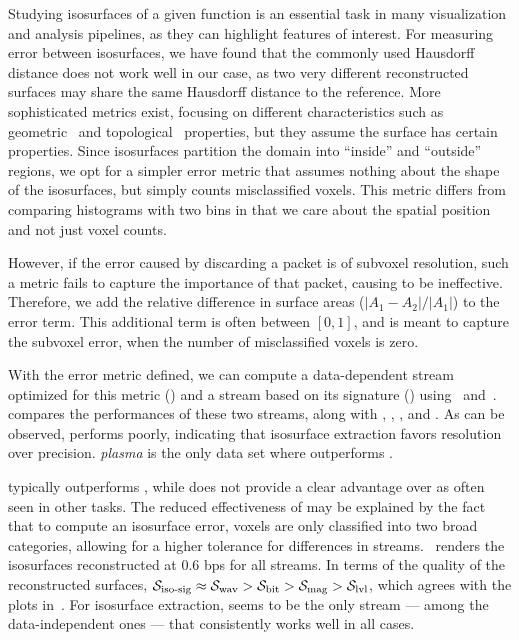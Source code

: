 Studying isosurfaces of a given function is an essential task in many visualization and analysis
pipelines, as they can highlight features of interest. For measuring error between isosurfaces, we
have found that the commonly used Hausdorff distance does not work well in our case, as two very
different reconstructed surfaces may share the same Hausdorff distance to the reference. More
sophisticated metrics exist, focusing on different characteristics such as
geometric~\cite{verifiable-isosurface} and topological~\cite{topology-verification-isosurface}
properties, but they assume the surface has certain properties. Since isosurfaces partition the
domain into ``inside'' and ``outside'' regions, we opt for a simpler error metric that assumes
nothing about the shape of the isosurfaces, but simply counts misclassified voxels. This metric
differs from comparing histograms with two bins in that we care about the spatial position and not
just voxel counts.

However, if the error caused by discarding a packet is of subvoxel resolution, such a metric fails
to capture the importance of that packet, causing \siop to be ineffective. Therefore, we add the
relative difference in surface areas ($|A_1-A_2|/|A_1|$) to the error term. This additional term is
often between $[0, 1]$, and is meant to capture the subvoxel error, when the number of misclassified
voxels is zero.

With the error metric defined, we can compute a data-dependent stream optimized for this metric
(\siop) and a stream based on its signature (\sisg) using~
and~.  compares the performances of these two
streams, along with \sbit, \slvl, \swav, and \smag. As can be observed, \slvl performs poorly,
indicating that isosurface extraction favors resolution over precision. \emph{plasma} is the only
data set where \sbit outperforms \swav.

\swav typically outperforms \sbit, while \sisg does not provide a clear advantage over \swav as
often seen in other tasks. The reduced effectiveness of \sisg may be explained by the fact that to
compute an isosurface error, voxels are only classified into two broad categories, allowing for a
higher tolerance for differences in streams.~ renders the
isosurfaces reconstructed at 0.6 bps for all streams. In terms of the quality of the reconstructed
surfaces, $\sisg \approx \swav > \sbit > \smag > \slvl$, which agrees with the plots
in~. For isosurface extraction, \swav seems to be the only stream ---
among the data-independent ones --- that consistently works well in all cases.
